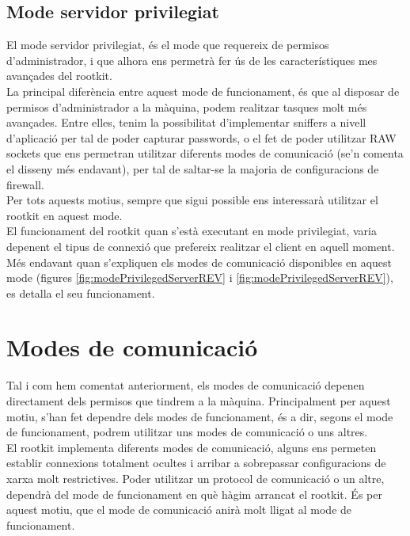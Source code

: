 \subsection{Mode servidor privilegiat}

El mode servidor privilegiat, és el mode que requereix de permisos d'administrador, i que alhora ens permetrà
fer ús de les característiques mes avançades del rootkit. \\

La principal diferència entre aquest mode de funcionament, és que al disposar de permisos d'administrador a
la màquina, podem realitzar tasques molt més avançades. Entre elles, tenim la possibilitat d'implementar 
sniffers a nivell d'aplicació per tal de poder capturar passwords, o el fet de poder utilitzar RAW sockets que
ens permetran utilitzar diferents modes de comunicació (se'n comenta el disseny més endavant), per tal de 
saltar-se la majoria de configuracions de firewall. \\

Per tots aquests motius, sempre que sigui possible ens interessarà utilitzar el rootkit en aquest mode. \\

El funcionament del rootkit quan s'està executant en mode privilegiat, varia depenent el tipus de connexió
que prefereix realitzar el client en aquell moment. Més endavant quan s'expliquen els modes de comunicació disponibles
en aquest mode (figures \ref{fig:modePrivilegedServerREV} i \ref{fig:modePrivilegedServerREV}), es detalla el seu funcionament. \\

\section{Modes de comunicació}

Tal i com hem comentat anteriorment, els modes de comunicació depenen directament dels permisos que tindrem 
a la màquina. Principalment per aquest motiu, s'han fet dependre dels modes de funcionament, és a dir, segons el
mode de funcionament, podrem utilitzar uns modes de comunicació o uns altres. \\

El rootkit implementa diferents modes de comunicació, alguns ens permeten establir connexions totalment
ocultes i arribar a sobrepassar configuracions de xarxa molt restrictives. Poder utilitzar un protocol de 
comunicació o un altre, dependrà del mode de funcionament en què hàgim arrancat el rootkit. És per aquest
motiu, que el mode de comunicació anirà molt lligat al mode de funcionament. \\

